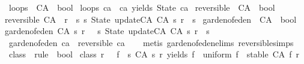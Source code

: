 \begin{isabellebody}
\isanewline
{}\isamarkupfalse%
\ loops\ {\isacharcolon}{\isacharcolon}\ {\isachardoublequoteopen}CA\ {\isasymRightarrow}\ bool{\isachardoublequoteclose}\ \isanewline
{\isachardoublequoteopen}loops\ ca\ {\isasymequiv}\ ca\ yields\ State\ ca{\isachardoublequoteclose}\isanewline
\isanewline
{}\isamarkupfalse%
\ reversible\ {\isacharcolon}{\isacharcolon}\ {\isachardoublequoteopen}CA\ {\isasymRightarrow}\ bool{\isachardoublequoteclose}\ \isanewline
{\isachardoublequoteopen}reversible\ {\isacharparenleft}CA\ {\isacharunderscore}\ r{\isacharparenright}\ {\isacharequal}\ {\isacharparenleft}{\isasymforall}s{\isachardot}\ {\isacharparenleft}{\isasymexists}{\isacharbang}s{}{\isachardot}\ State\ {\isacharparenleft}update{\isacharunderscore}CA\ {\isacharparenleft}CA\ s{}\ r{\isacharparenright}{\isacharparenright}\ {\isacharequal}\ s{\isacharparenright}{\isacharparenright}{\isachardoublequoteclose}\isanewline
\isanewline
{}\isamarkupfalse%
\ garden{\isacharunderscore}of{\isacharunderscore}eden\ {\isacharcolon}{\isacharcolon}\ {\isachardoublequoteopen}CA\ {\isasymRightarrow}\ bool{\isachardoublequoteclose}\ \isanewline
{\isachardoublequoteopen}garden{\isacharunderscore}of{\isacharunderscore}eden\ {\isacharparenleft}CA\ s\ r{\isacharparenright}\ {\isacharequal}\ {\isacharparenleft}{\isasymnot}{\isacharparenleft}{\isasymexists}\ s{}{\isachardot}\ State\ {\isacharparenleft}update{\isacharunderscore}CA\ {\isacharparenleft}CA\ s{}\ r{\isacharparenright}{\isacharparenright}\ {\isacharequal}\ s{\isacharparenright}{\isacharparenright}{\isachardoublequoteclose}\isanewline
\isanewline
{}\isamarkupfalse%
\ {\isachardoublequoteopen}garden{\isacharunderscore}of{\isacharunderscore}eden\ ca\ {\isasymLongrightarrow}\ {\isasymnot}reversible\ ca{\isachardoublequoteclose}\isanewline
%
\isadelimproof
\ \ %
\endisadelimproof
%
\isatagproof
{}\isamarkupfalse%
\ {\isacharparenleft}metis\ garden{\isacharunderscore}of{\isacharunderscore}eden{\isachardot}elims{\isacharparenleft}{}{\isacharparenright}\ reversible{\isachardot}simps{\isacharparenright}%
\endisatagproof
{\isafoldproof}%
%
\isadelimproof
\isanewline
%
\endisadelimproof
\isanewline
\isanewline
{}\isamarkupfalse%
\ class{}\ {\isacharcolon}{\isacharcolon}\ {\isachardoublequoteopen}rule\ {\isasymRightarrow}\ bool{\isachardoublequoteclose}\ \isanewline
{\isachardoublequoteopen}class{}\ r\ {\isasymequiv}\ {\isacharparenleft}{\isasymexists}{\isacharbang}\ f{\isachardot}\ {\isacharparenleft}{\isasymforall}\ s{\isachardot}\ {\isacharparenleft}CA\ s\ r{\isacharparenright}\ yields\ f\ {\isasymand}\ uniform\ f\ {\isasymand}\ stable\ {\isacharparenleft}CA\ f\ r{\isacharparenright}{\isacharparenright}{\isacharparenright}{\isachardoublequoteclose}\isanewline

\end{isabellebody}
